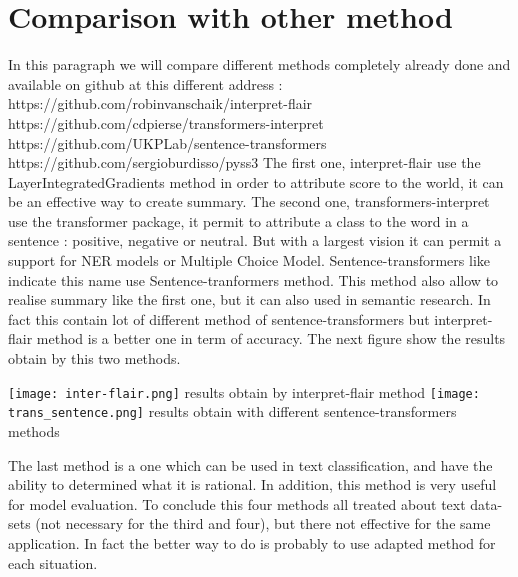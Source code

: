 \documentclass[sigplan,screen]{acmart}
\begin{document}
\section{Comparison with other method}

\Large
In this paragraph we will compare different methods completely already done and available on github at this different address :
\small
https://github.com/robinvanschaik/interpret-flair
\newline
https://github.com/cdpierse/transformers-interpret
\newline
https://github.com/UKPLab/sentence-transformers
\newline
https://github.com/sergioburdisso/pyss3
\newline
\newline
\Large
The first one, interpret-flair use the LayerIntegratedGradients method in order to attribute score to the world, it can be an effective way to create summary.
The second one, transformers-interpret use the transformer package, it permit to attribute a class to the word in a sentence : positive, negative or neutral. But with a largest vision it can permit a support for NER models or Multiple Choice Model.
Sentence-transformers like indicate this name use Sentence-tranformers method. This method also allow to realise summary like the first one, but it can also used in semantic research. In fact this contain lot of different method of sentence-transformers but interpret-flair method is a better one in term of accuracy. The next figure show the results obtain by this two methods.

    \centering
        \texttt{[image: inter-flair.png]}
        \small
        results obtain by interpret-flair method
        \newline
    \centering
        \texttt{[image: trans\_sentence.png]}
        \small
        results obtain with different sentence-transformers methods
        \newline

\Large
The last method is a one which can be used in text classification, and have the ability to determined what it is rational. In addition, this method is very useful for model evaluation.
\newline
To conclude this four methods all treated about text data-sets (not necessary for the third and four), but there not effective for the same application. In fact the better way to do is probably to use adapted method for each situation.
\end{document}
